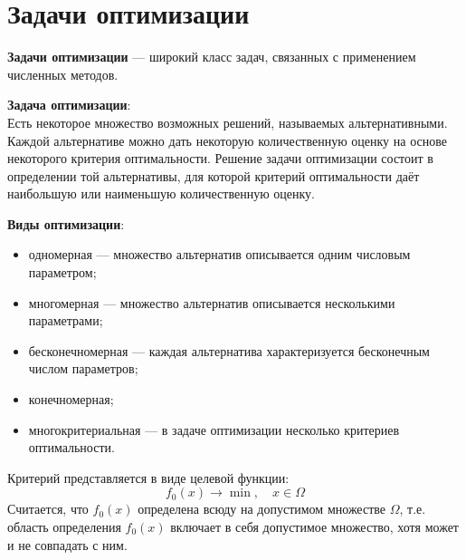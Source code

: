 \documentclass[17pt]{extarticle}
\begin{document}
\section{Задачи оптимизации}

\textbf{Задачи оптимизации} — широкий класс задач, связанных с применением численных методов.

\textbf{Задача оптимизации}: \\
Есть некоторое множество возможных решений, называемых альтернативными. Каждой альтернативе можно дать некоторую количественную оценку на основе некоторого критерия оптимальности. Решение задачи оптимизации состоит в определении той альтернативы, для которой критерий оптимальности даёт наибольшую или наименьшую количественную оценку.

\textbf{Виды оптимизации}:
\begin{itemize}
    \item одномерная — множество альтернатив описывается одним числовым параметром;
    \item многомерная — множество альтернатив описывается несколькими параметрами;
    \item бесконечномерная — каждая альтернатива характеризуется бесконечным числом параметров;
    \item конечномерная;
    \item многокритериальная — в задаче оптимизации несколько критериев оптимальности.
\end{itemize}

Критерий представляется в виде целевой функции: \\
\[ f_0(x) \to \min, \quad x \in \Omega \]
Считается, что \( f_0(x) \) определена всюду на допустимом множестве \( \Omega \), т.е. область определения \( f_0(x) \) включает в себя допустимое множество, хотя может и не совпадать с ним.
\end{document}
